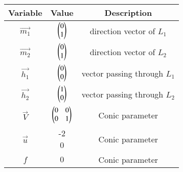 \begin{tabular}[12pt]{ |c|c|c|}
    \hline
	\textbf{Variable} & \textbf{Value} & \textbf{Description}\\ 
    \hline
	$\vec{m_1}$ & $\begin{pmatrix}0\\1\end{pmatrix}$ & direction vector of $L_1$\\
    \hline
	$\vec{m_2}$ & $\begin{pmatrix}0\\1\end{pmatrix}$ & direction vector of $L_2$\\
    \hline
	$\vec{h_1}$ & $\begin{pmatrix}0\\0\end{pmatrix}$ & vector passing through $L_1$ \\
    \hline
	$\vec{h_2}$ & $\begin{pmatrix}1\\0\end{pmatrix}$ & vector passing through $L_2$\\
    \hline
	$\vec{V}$ & $\begin{pmatrix}0 & 0\\0 & 1\end{pmatrix}$ & Conic parameter\\
    \hline
	$\vec{u}$ & \myvec{-2 \\0} & Conic parameter\\
    \hline
	$f$ & $0$ & Conic parameter\\
    \hline
\end{tabular}
